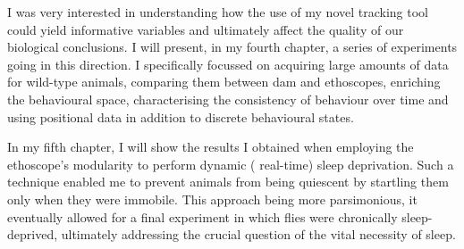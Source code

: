 I was very interested in understanding how the use of my novel tracking tool could yield informative variables and ultimately affect the quality of our biological conclusions.
I will present, in my fourth chapter, a series of experiments going in this direction.
I specifically focussed on acquiring large amounts of data for wild-type animals, comparing them between \gls{dam} and ethoscopes,
enriching the behavioural space, characterising the consistency of behaviour over time and using positional data in addition to discrete behavioural states.

In my fifth chapter, I will show the results I obtained when employing the ethoscope's modularity to perform dynamic (\ie{} real-time) sleep deprivation.
Such a technique enabled me to prevent animals from being quiescent by startling them only when they were immobile. 
This approach being more parsimonious, 
it eventually allowed for a final experiment in which 
flies were chronically sleep-deprived, ultimately addressing the crucial question of the vital necessity of sleep.
